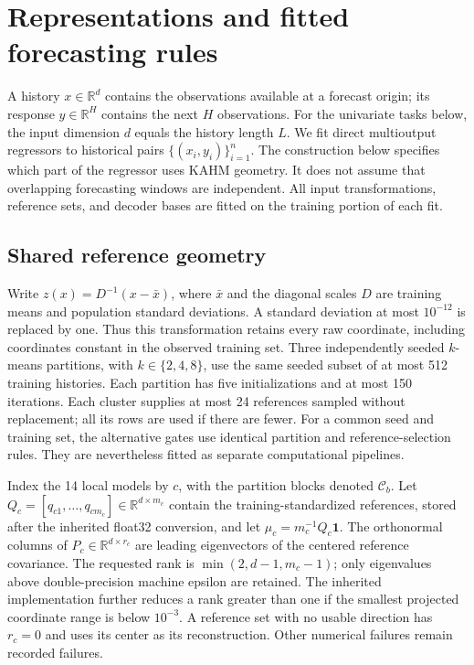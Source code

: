 \section{Representations and fitted forecasting rules}
\label{sec:nf-methods}

A history $x\in\mathbb R^d$ contains the observations available at a forecast
origin; its response $y\in\mathbb R^H$ contains the next $H$ observations.
For the univariate tasks below, the input dimension $d$ equals the history length $L$.
We fit direct multioutput regressors to historical pairs
$\{(x_i,y_i)\}_{i=1}^n$.  The construction below specifies which part of the
regressor uses KAHM geometry.  It does not assume that overlapping forecasting
windows are independent.  All input transformations, reference sets, and
decoder bases are fitted on the training portion of each fit.

\subsection{Shared reference geometry}
\label{sec:nf-reference-geometry}

Write $z(x)=D^{-1}(x-\bar x)$, where $\bar x$ and the diagonal scales $D$ are
training means and population standard deviations.  A standard deviation at
most $10^{-12}$ is replaced by one.  Thus this transformation retains every
raw coordinate, including coordinates constant in the observed training set.
Three independently seeded $k$-means partitions, with $k\in\{2,4,8\}$, use
the same seeded subset of at most 512 training histories.  Each partition has
five initializations and at most 150 iterations.  Each cluster supplies at
most 24 references sampled without replacement; all its rows are used if
there are fewer.  For a common seed and training set, the alternative gates
use identical partition and reference-selection rules.  They are nevertheless
fitted as separate computational pipelines.

Index the 14 local models by $c$, with the partition blocks denoted
$\mathcal C_b$.  Let
$Q_c=[q_{c1},\ldots,q_{cm_c}]\in\mathbb R^{d\times m_c}$ contain the
training-standardized references, stored after the inherited float32
conversion, and let $\mu_c=m_c^{-1}Q_c\mathbf 1$.
The orthonormal columns of $P_c\in\mathbb R^{d\times r_c}$ are leading
eigenvectors of the centered reference covariance.  The requested rank is
$\min(2,d-1,m_c-1)$; only eigenvalues above double-precision machine epsilon
are retained.  The inherited implementation further reduces a rank greater
than one if the smallest projected coordinate range is below $10^{-3}$.
A reference set with no usable direction has $r_c=0$ and uses its center as
its reconstruction.  Other numerical failures remain recorded failures.

